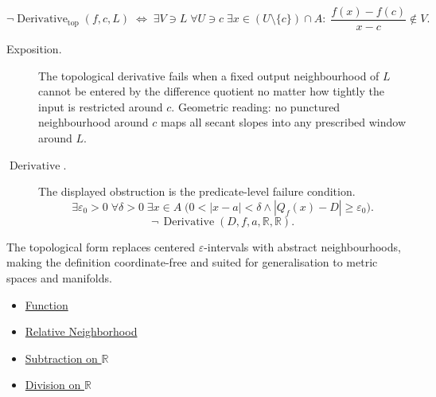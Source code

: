 \begin{remark*}
\[
\neg\operatorname{Derivative}_{\mathrm{top}}(f,c,L)
\;\Longleftrightarrow\;
\exists V \ni L\;\forall U \ni c\;\exists x \in (U\setminus\{c\})\cap A:\;
\frac{f(x)-f(c)}{x-c}\notin V.
\]
\end{remark*}

\begin{remark*}
\begin{description}
  \item[Exposition.]
The topological derivative fails when a fixed output neighbourhood of $L$ cannot be entered by the difference quotient no matter how tightly the input is restricted around $c$. Geometric reading: no punctured neighbourhood around $c$ maps all secant slopes into any prescribed window around $L$.


  \item[\(\operatorname{Derivative}.\)]
  The displayed obstruction is the predicate-level failure condition.
  \[
  \exists\varepsilon_0>0\;\forall\delta>0\;\exists x\in A\;\bigl(0<|x-a|<\delta\land |Q_f(x)-D|\ge\varepsilon_0\bigr).
  \]
  \[
  \neg\,\operatorname{Derivative}(D,f,a,\mathbb{R},\mathbb{R}).
  \]
\end{description}
\end{remark*}

\begin{remark*}[Interpretation]
The topological form replaces centered $\varepsilon$-intervals with abstract neighbourhoods, making the definition coordinate-free and suited for generalisation to metric spaces and manifolds.
\end{remark*}

\begin{dependencies}
\begin{itemize}
  \item \hyperref[def:function]{Function}
  \item \hyperref[def:relative-neighborhood]{Relative Neighborhood}
  \item \hyperref[def:subtraction-on-r]{Subtraction on $\mathbb{R}$}
  \item \hyperref[def:division-on-r]{Division on $\mathbb{R}$}
\end{itemize}
\end{dependencies}


